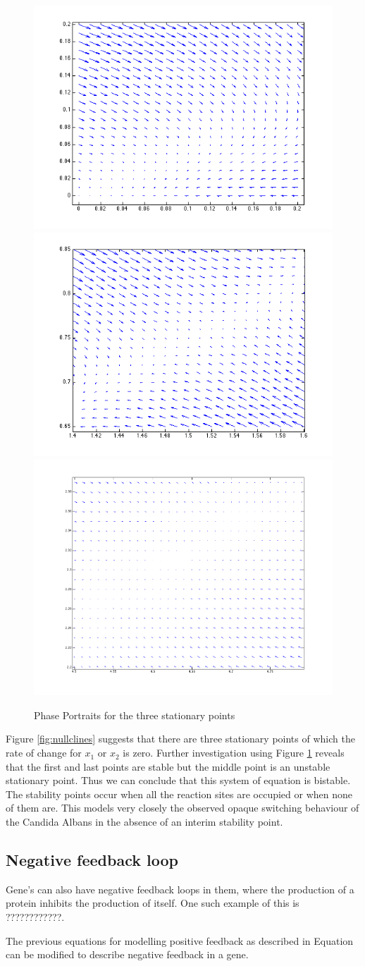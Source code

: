 \documentclass[]{article}
\begin{document}
\begin{figure}[h]
\caption{Phase Portraits for the three stationary points}
\centering
\includegraphics[width=.3\textwidth]{zerozero.png}\hfill
\includegraphics[width=.3\textwidth]{unstable.png}\hfill
\includegraphics[width=.3\textwidth]{max.png}
\label{fig:phaseport}
\end{figure}

Figure \ref{fig:nullclines} suggests that there are three stationary points of which the rate of change for $x_1$ or $x_2$ is zero. Further investigation using Figure \ref{fig:phaseport} reveals that the first and last points are stable but the middle point is an unstable stationary point. Thus we can conclude that this system of equation is bistable. The stability points occur when all the reaction sites are occupied or when none of them are. This models very closely the observed opaque switching behaviour of the Candida Albans in the absence of an interim stability point.\\ 

 \pagebreak

\subsection{Negative feedback loop}
Gene's can also have negative feedback loops in them, where the production of a protein inhibits the production of itself. One such example of this is ????????????.

The previous equations for modelling positive feedback as described in Equation \pageref{eq:posfeed} can be modified to describe negative feedback in a gene. 
\end{document}
